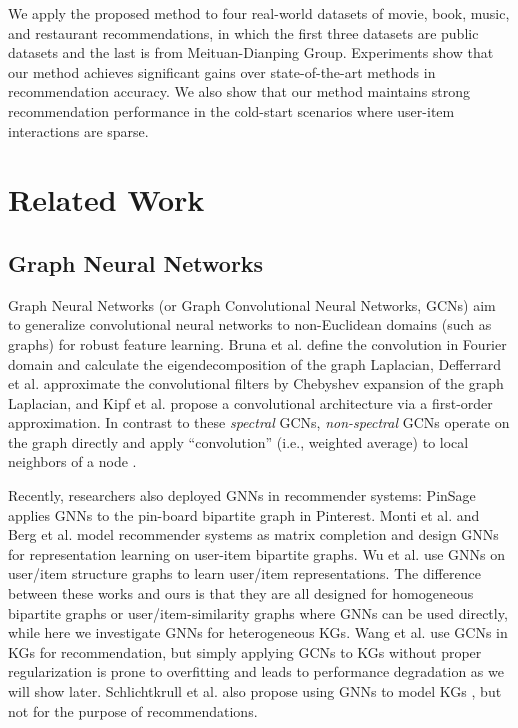 \documentclass[sigconf]{acmart}
\begin{document}
	We apply the proposed method to four real-world datasets of movie, book, music, and restaurant recommendations, in which the first three datasets are public datasets and the last is from Meituan-Dianping Group.
	Experiments show that our method achieves significant gains over state-of-the-art methods in recommendation accuracy.
	We also show that our method maintains strong recommendation performance in the cold-start scenarios where user-item interactions are sparse.



\section{Related Work}


	\subsection{Graph Neural Networks}
	\label{sec:gcn_rs}
		Graph Neural Networks (or Graph Convolutional Neural Networks, GCNs) aim to generalize convolutional neural networks to non-Euclidean domains (such as graphs) for robust feature learning.
		Bruna et al. \cite{bruna2014spectral} define the convolution in Fourier domain and calculate the eigendecomposition of the graph Laplacian,
		Defferrard et al. \cite{defferrard2016convolutional} approximate the convolutional filters by Chebyshev expansion of the graph Laplacian,
		and Kipf et al. \cite{kipf2017semi} propose a convolutional architecture via a first-order approximation.
		In contrast to these \textit{spectral} GCNs, \textit{non-spectral} GCNs operate on the graph directly and apply ``convolution'' (i.e., weighted average) to local neighbors of a node \cite{duvenaud2015convolutional,niepert2016learning,hamilton2017inductive}.
		
		Recently, researchers also deployed GNNs in recommender systems: PinSage \cite{ying2018graph} applies GNNs to the pin-board bipartite graph in Pinterest.
		Monti et al. \cite{monti2017geometric} and Berg et al. \cite{van2017graph} model recommender systems as matrix completion and design GNNs for representation learning on user-item bipartite graphs.
		Wu et al. \cite{wu2018graph} use GNNs on user/item structure graphs to learn user/item representations.
		The difference between these works and ours is that they are all designed for homogeneous bipartite graphs or user/item-similarity graphs where GNNs can be used directly, while here we investigate GNNs for heterogeneous KGs.
		Wang et al. \cite{wang2019knowledge} use GCNs in KGs for recommendation, but simply applying GCNs to KGs without proper regularization is prone to overfitting and leads to performance degradation as we will show later.
		Schlichtkrull et al. also propose using GNNs to model KGs \cite{schlichtkrull2018modeling}, but not for the purpose of recommendations.
				
\end{document}
